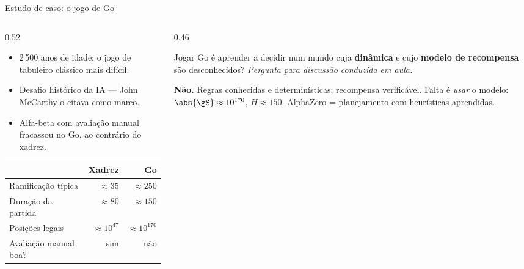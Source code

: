 \documentclass[aspectratio=169, 10pt]{beamer}
\newcommand{\paradiscussao}{\smallskip
  {\footnotesize\color{rlCinza}\itshape Pergunta para discussão conduzida em aula.}}
\begin{document}
\begin{frame}{Estudo de caso: o jogo de Go}
  \footnotesize
  \begin{columns}[T]
    \begin{column}{0.52\textwidth}
      \begin{itemize}
        \item 2\,500 anos de idade; o jogo de tabuleiro clássico mais difícil.
        \item Desafio histórico da IA — John McCarthy o citava como marco.
        \item Alfa-beta com avaliação manual \alert{fracassou} no Go, ao contrário do xadrez.
      \end{itemize}
      \medskip
      \begin{center}
      \tiny
      \begin{tabular}{lrr}
        \toprule
         & \textbf{Xadrez} & \textbf{Go} \\
        \midrule
        Ramificação típica      & $\approx 35$   & $\approx 250$ \\
        Duração da partida      & $\approx 80$   & $\approx 150$ \\
        Posições legais         & $\approx 10^{47}$ & $\approx 10^{170}$ \\
        Avaliação manual boa?   & sim            & \alert{não} \\
        \bottomrule
      \end{tabular}
      \end{center}
    \end{column}
    \begin{column}{0.46\textwidth}
      \begin{quizbox}{}
        Jogar Go é aprender a decidir num mundo cuja \textbf{dinâmica} e cujo
        \textbf{modelo de recompensa} são desconhecidos?
        \paradiscussao
      \end{quizbox}
      \pause
      \vspace{-0.3em}
      \begin{respbox}
        \textbf{Não.} Regras conhecidas e determinísticas; recompensa verificável.
        Falta é \emph{usar} o modelo: $\abs{\gS}\approx 10^{170}$, $H \approx 150$.
        AlphaZero = \alert{planejamento} com heurísticas aprendidas.
      \end{respbox}
    \end{column}
  \end{columns}
\end{frame}
\end{document}

